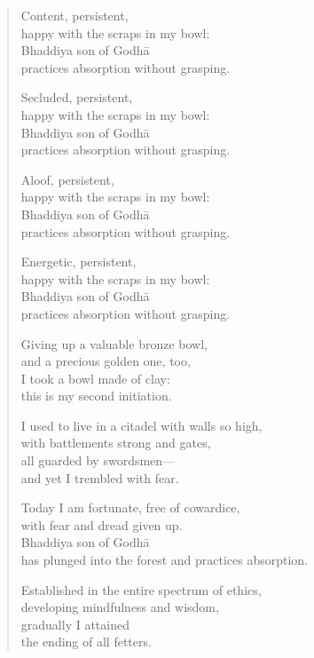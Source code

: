 \documentclass[12pt,openany]{book}%
\begin{document}
\begin{verse}
Content, persistent, \\
happy with the scraps in my bowl: \\
Bhaddiya son of \textsanskrit{Godhā} \\
practices absorption without grasping. 

Secluded, persistent, \\
happy with the scraps in my bowl: \\
Bhaddiya son of \textsanskrit{Godhā} \\
practices absorption without grasping. 

Aloof, persistent, \\
happy with the scraps in my bowl: \\
Bhaddiya son of \textsanskrit{Godhā} \\
practices absorption without grasping. 

Energetic, persistent, \\
happy with the scraps in my bowl: \\
Bhaddiya son of \textsanskrit{Godhā} \\
practices absorption without grasping. 

Giving up a valuable bronze bowl, \\
and a precious golden one, too, \\
I took a bowl made of clay: \\
this is my second initiation. 

I used to live in a citadel with walls so high, \\
with battlements strong and gates, \\
all guarded by swordsmen—\\
and yet I trembled with fear. 

Today I am fortunate, free of cowardice, \\
with fear and dread given up. \\
Bhaddiya son of \textsanskrit{Godhā} \\
has plunged into the forest and practices absorption. 

Established in the entire spectrum of ethics, \\
developing mindfulness and wisdom, \\
gradually I attained \\
the ending of all fetters. 

%
\end{verse}
\end{document}
